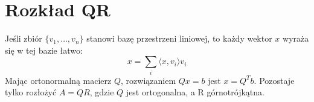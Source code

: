 \section{Rozkład QR}
Jeśli zbiór \( \{v_1, \dots, v_n\} \) stanowi bazę przestrzeni liniowej, to każdy wektor \( x \) wyraża się w tej bazie łatwo:
\[
    x = \sum_{i} \langle x, v_i \rangle v_i
\]
Mając ortonormalną macierz \( Q \), rozwiązaniem \( Qx = b \) jest \( x = Q^T b \). Pozostaje tylko rozłożyć \( A = QR \), gdzie \( Q \) jest ortogonalna, a R górnotrójkątna.